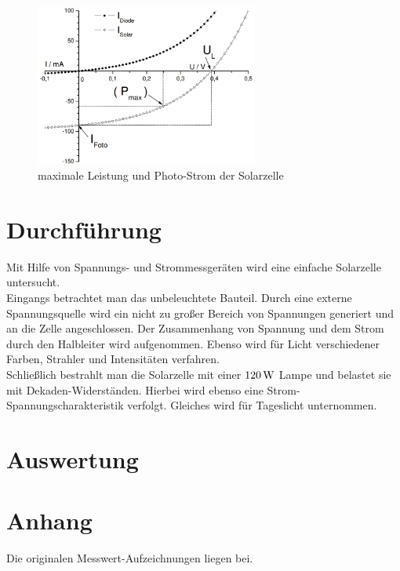 \documentclass[numbers=noenddot,12pt,a4paper]{scrartcl}
\begin{document}
\begin{figure}[h]
	\centering
	\includegraphics[width=0.65\textwidth]{detail.png}
	\caption{maximale Leistung und Photo-Strom der Solarzelle} \label{img:detail}
	\end{figure}
\section{Durchführung}
Mit Hilfe von Spannungs- und Strommessgeräten wird eine einfache Solarzelle untersucht.\\
Eingangs betrachtet man das unbeleuchtete Bauteil. Durch eine externe Spannungsquelle wird ein nicht zu großer Bereich von Spannungen generiert und an die Zelle angeschlossen. Der Zusammenhang von Spannung und dem Strom durch den Halbleiter wird aufgenommen. Ebenso wird für Licht verschiedener Farben, Strahler und Intensitäten verfahren.\\
Schließlich bestrahlt man die Solarzelle mit einer $\unit[120]{W}$ Lampe und belastet sie mit Dekaden-Widerständen. Hierbei wird ebenso eine Strom-Spannungscharakteristik verfolgt. Gleiches wird für Tageslicht unternommen.
\section{Auswertung}
\section{Anhang}
Die originalen Messwert-Aufzeichnungen liegen bei.
\end{document}

